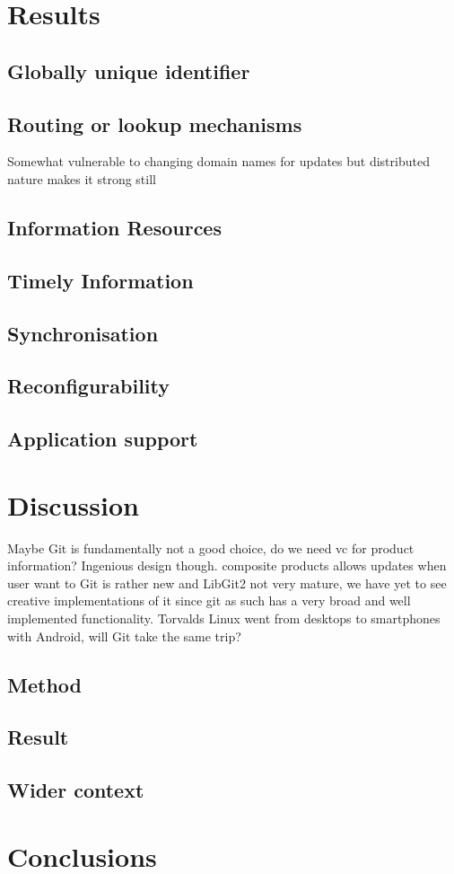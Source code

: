\documentclass[12pt,a4paper]{article}
\begin{document}

\section{Results}

\subsection{Globally unique identifier}
\subsection{Routing or lookup mechanisms}
Somewhat vulnerable to changing domain names for updates but distributed nature makes it strong still
\subsection{Information Resources}
\subsection{Timely Information}
\subsection{Synchronisation}
\subsection{Reconfigurability}
\subsection{Application support}

\section{Discussion}
Maybe Git is fundamentally not a good choice, do we need vc for product information? Ingenious design though. 
composite products
allows updates when user want to
Git is rather new and LibGit2 not very mature, we have yet to see creative implementations of it since git as such has a very broad and well implemented functionality. Torvalds Linux went from desktops to smartphones with Android, will Git take the same trip?
\subsection{Method}
\subsection{Result}
\subsection{Wider context}

\section{Conclusions}


\clearpage
 

\end{document}
